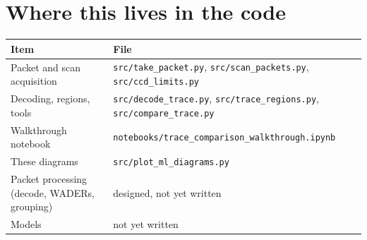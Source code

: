\documentclass[11pt]{article}
\newcommand{\code}[1]{\texttt{#1}}
\begin{document}
\section{Where this lives in the code}
\begin{center}
\begin{tabular}{ll}
\toprule
Item & File \\
\midrule
Packet and scan acquisition      & \code{src/take\_packet.py}, \code{src/scan\_packets.py}, \code{src/ccd\_limits.py} \\
Decoding, regions, tools         & \code{src/decode\_trace.py}, \code{src/trace\_regions.py}, \code{src/compare\_trace.py} \\
Walkthrough notebook             & \code{notebooks/trace\_comparison\_walkthrough.ipynb} \\
These diagrams                   & \code{src/plot\_ml\_diagrams.py} \\
Packet processing (decode, WADERs, grouping) & designed, not yet written \\
Models                           & not yet written \\
\bottomrule
\end{tabular}
\end{center}
\end{document}
